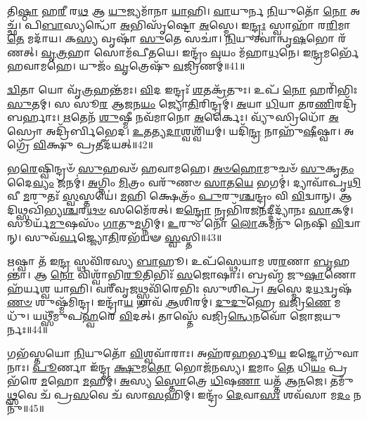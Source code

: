 𑌤𑌿\-\ul{𑌷𑍍𑌠𑌾} 𑌹\-\ul{𑌰𑍀} 𑌰\-\ul{𑌥} 𑌆 \ul{𑌯𑍁}\-𑌜𑍍𑌯𑌮𑌾᳴𑌨𑌾 \ul{𑌯𑌾}\-𑌹𑌿।
\-\ul{𑌵𑌾}\-𑌯𑍁𑌰𑍍𑌨 \ul{𑌨𑌿}\-𑌯𑍁𑌤𑍋᳴ \ul{𑌨𑍋} 𑌅𑌚𑍍𑌛᳴।
𑌪𑌿\-\ul{𑌬𑌾}\-𑌸𑍍𑌯𑌨𑍍𑌧𑍋᳴ \ul{𑌅}\-𑌭𑌿𑌸𑍃᳴𑌷𑍍𑌟𑍋 \ul{𑌅}\-𑌸𑍍𑌮𑍇।
𑌇\-\ul{𑌨𑍍𑌦𑍍𑌰𑌃} 𑌸𑍍𑌵𑌾𑌹𑌾᳴ 𑌰\-\ul{𑌰𑌿}\-𑌮𑌾 \ul{𑌤𑍇} 𑌮𑌦𑌾᳴𑌯।
𑌕\-\ul{𑌸𑍍𑌯} 𑌵𑍃𑌷𑌾᳴ \ul{𑌸𑍁}\-𑌤𑍇 𑌸𑌚𑌾॑।
\-\ul{𑌨𑌿}\-𑌯𑍁𑌤𑍍𑌵𑌾॑𑌨𑍍𑌵𑍃\-\ul{𑌷}\-𑌭𑍋 𑌰᳴𑌣𑌤𑍍।
\-\ul{𑌵𑍃}\-\-\ul{𑌤𑍍𑌰}\-𑌹𑌾 𑌸𑍋𑌮᳴𑌪𑍀𑌤𑌯𑍇।
𑌇𑌨𑍍𑌦𑍍𑌰𑌂᳴ \ul{𑌵}\-𑌯𑌂 𑌮᳴𑌹𑌾\-\ul{𑌧}\-𑌨𑍇।
𑌇\-\ul{𑌨𑍍𑌦𑍍𑌰}\-𑌮𑌰𑍍𑌭𑍇᳴ 𑌹𑌵𑌾𑌮𑌹𑍇।
𑌯𑍁𑌜𑌂᳴ \ul{𑌵𑍃}\-𑌤𑍍𑌰𑍇𑌷𑍁᳴ \ul{𑌵}\-𑌜𑍍𑌰𑌿𑌣𑌮𑍍॑॥41॥

\-\ul{𑌦𑍍𑌵𑌿}\-𑌤𑌾 𑌯𑍋 𑌵𑍃᳴\-\ul{𑌤𑍍𑌰}\-𑌹𑌨𑍍𑌤᳴𑌮𑌃।
\-\ul{𑌵𑌿}\-𑌦 𑌇𑌨𑍍𑌦𑍍𑌰𑌃᳴ \ul{𑌶}\-𑌤𑌕𑍍𑌰᳴𑌤𑍁𑌃।
𑌉𑌪᳴ \ul{𑌨𑍋} 𑌹𑌰𑌿᳴𑌭𑌿𑌃 \ul{𑌸𑍁}\-𑌤𑌮𑍍।
𑌸 𑌸𑍂\-\ul{𑌰} 𑌆\-\ul{𑌜}\-𑌨\-\ul{𑌯𑌂} 𑌜𑍍𑌯𑍋\-\ul{𑌤𑌿}\-𑌰𑌿𑌨𑍍𑌦𑍍𑌰𑌮𑍍॑।
\-\ul{𑌅}\-𑌯𑌾 \ul{𑌧𑌿}\-𑌯𑌾 \ul{𑌤}\-𑌰\-\ul{𑌣𑌿}\-𑌰𑌦𑍍𑌰𑌿᳴𑌬𑌰𑍍\mbox{}𑌹𑌾𑌃।
\-\ul{𑌋}\-𑌤𑍇𑌨᳴ \ul{𑌶𑍁}\-𑌷𑍍𑌮𑍀 𑌨𑌵᳴𑌮𑌾𑌨𑍋 \ul{𑌅}\-𑌰𑍍𑌕𑍈𑌃।
𑌵𑍍𑌯𑍁᳴𑌸𑍍𑌰𑌿𑌧𑍋᳴ \ul{𑌅}\-𑌸𑍍𑌰𑍋 𑌅𑌦𑍍𑌰𑌿᳴𑌰𑍍𑌬𑌿𑌭𑍇𑌦।
\-\ul{𑌉}\-𑌤𑌤𑍍𑌯\-\ul{𑌦𑌾}\-𑌶𑍍𑌵𑌶𑍍𑌵𑌿᳴𑌯𑌮𑍍।
𑌯𑌦𑌿᳴\-\ul{𑌨𑍍𑌦𑍍𑌰} 𑌨𑌾𑌹𑍁᳴\-\ul{𑌷𑍀}\-𑌷𑍍𑌵𑌾।
𑌅𑌗𑍍𑌰𑍇᳴ \ul{𑌵𑌿}\-𑌕𑍍𑌷𑍁 𑌪𑍍𑌰𑌤𑍀𑌦᳴𑌯𑌤𑍍॥42॥

𑌭\-\ul{𑌰𑍇}\-𑌷𑍍𑌵𑌿𑌨𑍍𑌦𑍍𑌰𑍞᳴ \ul{𑌸𑍁}\-𑌹𑌵𑍞᳴ 𑌹𑌵𑌾𑌮𑌹𑍇।
\-\ul{𑌅}\-\-\ul{𑍞}\-\-\ul{𑌹𑍋}\-𑌮𑍁𑌚𑍞᳴ \ul{𑌸𑍁}\-𑌕𑍃\-\ul{𑌤𑌂} 𑌦𑍈\-\ul{𑌵𑍍𑌯𑌂} 𑌜𑌨𑌮𑍍॑।
\-\ul{𑌅}\-𑌗𑍍𑌨𑌿𑌂 \ul{𑌮𑌿}\-𑌤𑍍𑌰𑌂 𑌵𑌰𑍁᳴𑌣𑍞 \ul{𑌸𑌾}\-𑌤\-\ul{𑌯𑍇} 𑌭𑌗𑌮𑍍॑।
𑌦𑍍𑌯𑌾𑌵𑌾᳴𑌪𑍃\-\ul{𑌥𑌿}\-𑌵𑍀 \ul{𑌮}\-𑌰𑍁𑌤𑌃᳴ \ul{𑌸𑍍𑌵}\-𑌸𑍍𑌤𑌯𑍇॑।
\-\ul{𑌮}\-𑌹𑌿 𑌕𑍍𑌷𑍇𑌤𑍍𑌰𑌂᳴ \ul{𑌪𑍁}\-𑌰𑍁\-\ul{𑌶𑍍𑌚}\-𑌨𑍍𑌦𑍍𑌰𑌂 𑌵𑌿 \ul{𑌵𑌿}\-𑌦𑍍𑌵𑌾𑌨𑍍।
𑌆𑌦𑌿𑌥𑍍𑌸𑌖𑌿᳴𑌭𑍍𑌯\-\ul{𑌶𑍍𑌚}\-𑌰\-\ul{𑌥}\-\-\ul{𑍞} 𑌸𑌮𑍈᳴𑌰𑌤𑍍।
𑌇\-\ul{𑌨𑍍𑌦𑍍𑌰𑍋} 𑌨𑍃𑌭𑌿᳴𑌰𑌜\-\ul{𑌨}\-𑌦𑍍𑌦𑍀𑌦𑍍𑌯𑌾᳴𑌨𑌃 \ul{𑌸𑌾}\-𑌕𑌮𑍍।
𑌸𑍂𑌰𑍍𑌯᳴\-\ul{𑌮𑍁}\-𑌷𑌸𑌂᳴ \ul{𑌗𑌾}\-𑌤𑍁\-\ul{𑌮}\-𑌗𑍍𑌨𑌿𑌮𑍍।
\-\ul{𑌉}\-𑌰𑍁𑌂 𑌨𑍋᳴ \ul{𑌲𑍋}\-𑌕𑌮𑌨𑍁᳴ 𑌨𑍇𑌷𑌿 \ul{𑌵𑌿}\-𑌦𑍍𑌵𑌾𑌨𑍍।
𑌸𑍁𑌵᳴\-\ul{𑌰𑍍𑌵}\-𑌜𑍍𑌜𑍍𑌯𑍋\-\ul{𑌤𑌿}\-𑌰𑌭᳴𑌯𑍟 \ul{𑌸𑍍𑌵}\-𑌸𑍍𑌤𑌿॥43॥

\-\ul{𑌋}\-𑌷𑍍𑌵𑌾 𑌤᳴ 𑌇\-\ul{𑌨𑍍𑌦𑍍𑌰} 𑌸𑍍𑌥𑌵𑌿᳴𑌰𑌸𑍍𑌯 \ul{𑌬𑌾}\-𑌹𑍂।
𑌉𑌪᳴𑌸𑍍𑌥𑍇𑌯𑌾𑌮 𑌶\-\ul{𑌰}\-𑌣𑌾 \ul{𑌬𑍃}\-𑌹𑌨𑍍𑌤𑌾॑।
𑌆 \ul{𑌨𑍋} 𑌵𑌿𑌶𑍍𑌵𑌾᳴𑌭𑌿\-\ul{𑌰𑍂}\-𑌤𑌿𑌭𑌿𑌃᳴ \ul{𑌸}\-𑌜𑍋𑌷𑌾𑌃॑।
𑌬𑍍𑌰𑌹𑍍𑌮᳴ 𑌜𑍁\-\ul{𑌷𑌾}\-𑌣𑍋 𑌹᳴𑌰𑍍𑌯𑌶𑍍𑌵 𑌯𑌾𑌹𑌿।
𑌵𑌰𑍀᳴𑌵𑍃\-\ul{𑌜}\-𑌥𑍍𑌸𑍍𑌥𑌵𑌿᳴𑌰𑍇𑌭𑌿𑌃 𑌸𑍁𑌶𑌿𑌪𑍍𑌰।
\-\ul{𑌅}\-𑌸𑍍𑌮𑍇 𑌦\-\ul{𑌧}\-𑌦𑍍𑌵𑍃𑌷᳴\-\ul{𑌣}\-\-\ul{𑍞} 𑌶𑍁𑌷𑍍𑌮᳴𑌮𑌿𑌨𑍍𑌦𑍍𑌰।
𑌇𑌨𑍍𑌦𑍍𑌰𑌾᳴\-\ul{𑌯} 𑌗𑌾𑌵᳴ \ul{𑌆}\-𑌶𑌿𑌰𑌮𑍍॑।
\-\ul{𑌦𑍁}\-\-\ul{𑌦𑍁}\-𑌹𑍍𑌰𑍇 \ul{𑌵}\-𑌜𑍍𑌰𑌿\-\ul{𑌣𑍇} 𑌮𑌧𑍁᳴।
𑌯𑌥𑍍𑌸𑍀᳴𑌮𑍁𑌪\-\ul{𑌹𑍍𑌵}\-𑌰𑍇 \ul{𑌵𑌿}\-𑌦𑌤𑍍।
𑌤𑌾𑌸𑍍𑌤𑍇᳴ 𑌵𑌜𑍍𑌰𑌿\-\ul{𑌨𑍍𑌧𑍇}\-𑌨𑌵𑍋᳴ 𑌜𑍋𑌜𑌯𑍁𑌰𑍍𑌨𑌃॥44॥

𑌗𑌭᳴𑌸𑍍𑌤𑌯𑍋 \ul{𑌨𑌿}\-𑌯𑍁𑌤𑍋᳴ \ul{𑌵𑌿}\-𑌶𑍍𑌵𑌵𑌾᳴𑌰𑌾𑌃।
𑌅𑌹᳴𑌰\-\ul{𑌹}\-𑌰𑍍𑌭𑍂\-\ul{𑌯} 𑌇𑌜𑍍𑌜𑍋𑌗𑍁᳴𑌵𑌾𑌨𑌾𑌃।
\-\ul{𑌪𑍂}\-𑌰𑍍𑌣𑌾 𑌇᳴𑌨𑍍𑌦𑍍𑌰 \ul{𑌕𑍍𑌷𑍁}\-𑌮\-\ul{𑌤𑍋} 𑌭𑍋𑌜᳴𑌨𑌸𑍍𑌯।
\-\ul{𑌇}\-𑌮𑌾𑌂 \ul{𑌤𑍇} 𑌧𑌿\-\ul{𑌯𑌂} 𑌪𑍍𑌰 𑌭᳴𑌰𑍇 \ul{𑌮}\-𑌹𑍋 \ul{𑌮}\-𑌹𑍀𑌮𑍍।
\-\ul{𑌅}\-𑌸𑍍𑌯 \ul{𑌸𑍍𑌤𑍋}\-𑌤𑍍𑌰𑍇 \ul{𑌧𑌿}\-𑌷\-\ul{𑌣𑌾} 𑌯𑌤𑍍𑌤᳴ 𑌆\-\ul{𑌨}\-𑌜𑍇।
𑌤𑌮𑍁᳴\-\ul{𑌥𑍍𑌸}\-𑌵𑍇 𑌚᳴ 𑌪𑍍𑌰\-\ul{𑌸}\-𑌵𑍇 𑌚᳴ 𑌸𑌾\-\ul{𑌸}\-𑌹𑌿𑌮𑍍।
𑌇𑌨𑍍𑌦𑍍𑌰𑌂᳴ \ul{𑌦𑍇}\-𑌵𑌾\-\ul{𑌸𑌃} 𑌶𑌵᳴𑌸𑌾 𑌮\-\ul{𑌦𑌂} 𑌨𑌨𑍁᳴॥45॥\anuvakamend[\-\ul{𑌵}\-𑌜𑍍𑌰𑌿𑌣᳴𑌮𑌯\-\ul{𑌥𑍍𑌸𑍍𑌵}\-𑌸𑍍𑌤𑌿 𑌜𑍋᳴𑌜𑌯𑍁𑌰𑍍𑌨𑌃 \ul{𑌸}\-𑌪𑍍𑌤 𑌚᳴]

